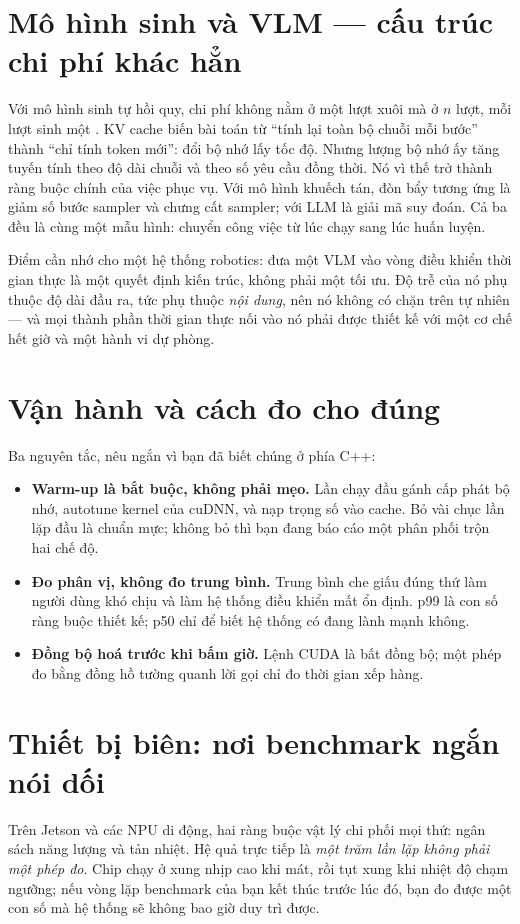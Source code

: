 \documentclass[../../deep_learning.tex]{subfiles}
\begin{document}
\section{Mô hình sinh và VLM --- cấu trúc chi phí khác hẳn}
Với mô hình sinh tự hồi quy, chi phí không nằm ở một lượt xuôi mà ở $n$ lượt, mỗi lượt sinh một . KV cache biến bài toán từ ``tính lại toàn bộ chuỗi mỗi bước'' thành ``chỉ tính token mới'': đổi bộ nhớ lấy tốc độ. Nhưng lượng bộ nhớ ấy tăng tuyến tính theo độ dài chuỗi và theo số yêu cầu đồng thời. Nó vì thế trở thành ràng buộc chính của việc phục vụ. Với mô hình khuếch tán, đòn bẩy tương ứng là giảm số bước sampler và chưng cất sampler; với LLM là giải mã suy đoán. Cả ba đều là cùng một mẫu hình: chuyển công việc từ lúc chạy sang lúc huấn luyện.

Điểm cần nhớ cho một hệ thống robotics: đưa một VLM vào vòng điều khiển thời gian thực là một quyết định kiến trúc, không phải một tối ưu. Độ trễ của nó phụ thuộc độ dài đầu ra, tức phụ thuộc \emph{nội dung}, nên nó không có chặn trên tự nhiên --- và mọi thành phần thời gian thực nối vào nó phải được thiết kế với một cơ chế hết giờ và một hành vi dự phòng.

\section{Vận hành và cách đo cho đúng}
Ba nguyên tắc, nêu ngắn vì bạn đã biết chúng ở phía C++:

\begin{itemize}
\item \textbf{Warm-up là bắt buộc, không phải mẹo.} Lần chạy đầu gánh cấp phát bộ nhớ, autotune kernel của cuDNN, và nạp trọng số vào cache. Bỏ vài chục lần lặp đầu là chuẩn mực; không bỏ thì bạn đang báo cáo một phân phối trộn hai chế độ.
\item \textbf{Đo phân vị, không đo trung bình.} Trung bình che giấu đúng thứ làm người dùng khó chịu và làm hệ thống điều khiển mất ổn định. p99 là con số ràng buộc thiết kế; p50 chỉ để biết hệ thống có đang lành mạnh không.
\item \textbf{Đồng bộ hoá trước khi bấm giờ.} Lệnh CUDA là bất đồng bộ; một phép đo bằng đồng hồ tường quanh lời gọi chỉ đo thời gian xếp hàng.
\end{itemize}

\section{Thiết bị biên: nơi benchmark ngắn nói dối}
Trên Jetson và các NPU di động, hai ràng buộc vật lý chi phối mọi thứ: ngân sách năng lượng và tản nhiệt. Hệ quả trực tiếp là \emph{một trăm lần lặp không phải một phép đo}. Chip chạy ở xung nhịp cao khi mát, rồi tụt xung khi nhiệt độ chạm ngưỡng; nếu vòng lặp benchmark của bạn kết thúc trước lúc đó, bạn đo được một con số mà hệ thống sẽ không bao giờ duy trì được.
\end{document}
